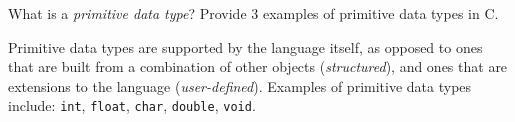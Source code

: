 What is a \emph{primitive data type}? Provide 3 examples of primitive data types in C.

\begin{answer}
Primitive data types are supported by the language itself,
as opposed to ones that are built from a combination of other objects (\emph{structured}),
and ones that are extensions to the language (\emph{user-defined}).
Examples of primitive data types include: \texttt{int}, \texttt{float}, \texttt{char}, \texttt{double}, \texttt{void}.
\end{answer}